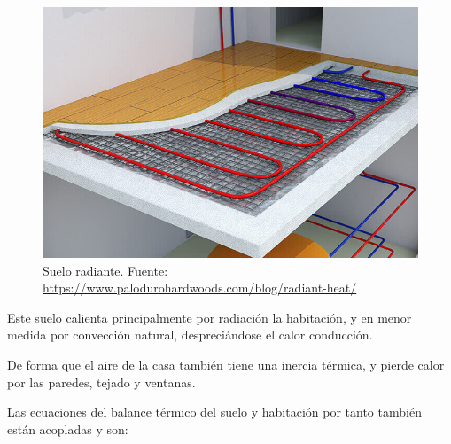 \begin{figure}[h] \centering
	\centering
	\includegraphics[width=1\textwidth]{./capitulos/resultados_discusion/images/radiant_heating_floor.jpg}
	\caption{Suelo radiante. Fuente: \url{https://www.palodurohardwoods.com/blog/radiant-heat/}}
	\label{fig:radiant_heating_floor}
\end{figure}

Este suelo calienta principalmente por radiación la habitación, y en menor
medida por convección natural, despreciándose el calor conducción.

De forma que el aire de la casa también tiene una inercia térmica, y pierde
calor por las paredes, tejado y ventanas.

Las ecuaciones del balance térmico del suelo y habitación por tanto también
están acopladas y son:
